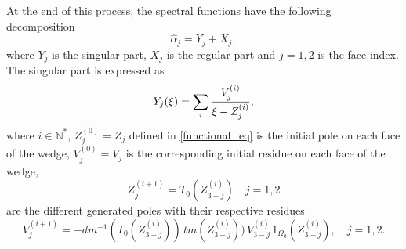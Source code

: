 At the end of this process, the spectral functions have the following decomposition
\begin{equation}
\label{spec_decomp}
\hat{\alpha}_j=Y_j+X_j, 
\end{equation}
where  $Y_j$ is the singular part, $X_j$ is the regular part  and $j=1,2$ is the face index. The singular part is expressed as
\begin{equation}
\label{sing_part}
 Y_j(\xi) = \sum_i {V_j^{(i)} \over \xi - Z_j^{(i)}},
\end{equation}
where $i \in \mathbb{N}^*$, $Z_j^{(0)} = Z_j$ defined in \eqref{functional_eq} is the initial pole on each face of the wedge, $V_j^{(0)}=V_j$ is the corresponding initial residue on each face of the wedge, 
\begin{equation}
\label{Generated_poles}
Z_j^{(i+1)} = T_0(Z_{3-j}^{(i)}) \quad j=1,2
\end{equation} 
are the different generated poles with their respective residues 
\begin{equation}
\label{Generated_residues}
V_j^{(i+1)}=-dm^{-1}(T_0(Z_{3-j}^{(i)})) \,  tm(Z_{3-j}^{(i)})) \, V_{3-j}^{(i)} \, 1_{\Omega_0}(Z_{3-j}^{(i)}), \quad  j=1,2.
\end{equation}
